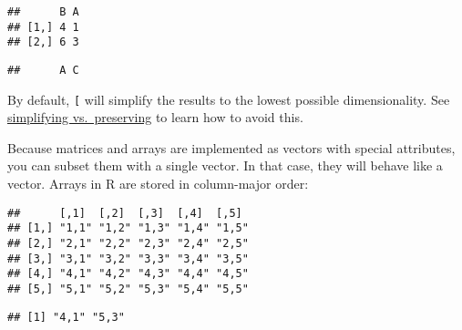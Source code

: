 \begin{verbatim}
##      B A
## [1,] 4 1
## [2,] 6 3
\end{verbatim}

\begin{Shaded}
\begin{Highlighting}[]
\NormalTok{a[}\NormalTok{, }\NormalTok{]}
\end{Highlighting}
\end{Shaded}

\begin{verbatim}
##      A C
\end{verbatim}

By default, \texttt{{[}} will simplify the results to the lowest
possible dimensionality. See
\protect\hyperlink{simplify-preserve}{simplifying vs.~preserving} to
learn how to avoid this.

Because matrices and arrays are implemented as vectors with special
attributes, you can subset them with a single vector. In that case, they
will behave like a vector. Arrays in R are stored in column-major order:

\begin{Shaded}
\begin{Highlighting}[]
\StringTok{ }\NormalTok{(}\OperatorTok{:}\NormalTok{, }\OperatorTok{:}\NormalTok{, } \NormalTok{, } \NormalTok{))}
\end{Highlighting}
\end{Shaded}

\begin{verbatim}
##      [,1]  [,2]  [,3]  [,4]  [,5] 
## [1,] "1,1" "1,2" "1,3" "1,4" "1,5"
## [2,] "2,1" "2,2" "2,3" "2,4" "2,5"
## [3,] "3,1" "3,2" "3,3" "3,4" "3,5"
## [4,] "4,1" "4,2" "4,3" "4,4" "4,5"
## [5,] "5,1" "5,2" "5,3" "5,4" "5,5"
\end{verbatim}

\begin{Shaded}
\begin{Highlighting}[]
\NormalTok{vals[}\NormalTok{(}\NormalTok{, }\NormalTok{)]}
\end{Highlighting}
\end{Shaded}

\begin{verbatim}
## [1] "4,1" "5,3"
\end{verbatim}


